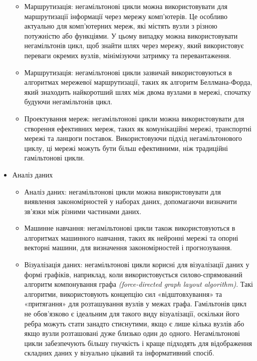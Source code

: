 \documentclass[14pt]{article}
\begin{document}
\begin{spacing}{1.175}
\begin{itemize}
\begin{itemize}
            \item Маршрутизація: негамільтонові цикли можна використовувати для маршрутизації інформації через мережу комп’ютерів. Це особливо актуально для комп’ютерних мереж, які містять вузли з різною потужністю або функціями. У цьому випадку можна використовувати негамільтонів цикл, щоб знайти шлях через мережу, який використовує переваги окремих вузлів, мінімізуючи затримку та перевантаження.
        
            \item Маршрутизація: негамільтонові цикли зазвичай використовуються в алгоритмах мережевої маршрутизації, таких як алгоритм Беллмана-Форда, який знаходить найкоротший шлях між двома вузлами в мережі, спочатку будуючи негамільтонів цикл.
            
            \item Проектування мереж: негамільтонові цикли можна використовувати для створення ефективних мереж, таких як комунікаційні мережі, транспортні мережі та ланцюги поставок. Використовуючи підхід негамільтонового циклу, ці мережі можуть бути більш ефективними, ніж традиційні гамільтонові цикли.
            
        \end{itemize}


        \item Аналіз даних
        \begin{itemize}
            
            \item Аналіз даних: негамільтонові цикли можна використовувати для виявлення закономірностей у наборах даних, допомагаючи визначити зв’язки між різними частинами даних.
            
            \item Машинне навчання: негамільтонові цикли також використовуються в алгоритмах машинного навчання, таких як нейронні мережі та опорні векторні машини, для визначення закономірностей і прогнозування.
                
            \item Візуалізація даних: негамільтонові цикли корисні для візуалізації даних у формі графіків, наприклад, коли використовується силово-спрямований алгоритм компонування графа \textit{(force-directed graph layout algorithm)}. Такі алгоритми, використовують концепцію сил «відштовхування» та «притягання» для розташування вузлів у межах графа. Гамільтонів цикл не обов’язково є ідеальним для такого виду візуалізації, оскільки його ребра можуть стати занадто стиснутими, якщо є лише кілька вузлів або якщо вузли розташовані дуже близько один до одного. Негамільтонові цикли забезпечують більшу гнучкість і краще підходять для відображення складних даних у візуально цікавий та інформативний спосіб.


\end{itemize}
\end{itemize}
\end{spacing}
\end{document}
